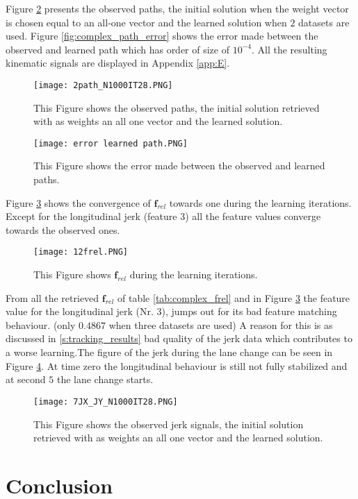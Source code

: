 Figure \ref{fig:complex_path} presents the observed paths, the initial solution when the weight vector is chosen equal to an all-one vector and the learned solution when $2$ datasets are used. Figure \ref{fig:complex_path_error} shows the error made between the observed and learned path which has order of size of $10^{-4}$. All the resulting kinematic signals are displayed in Appendix \ref{app:E}.

\begin{figure}[h!]
	\centering
	\texttt{[image: 2path\_N1000IT28.PNG]}
	\caption{This Figure shows the observed paths, the initial solution retrieved with as weights an all one vector and the learned solution.}	
	\label{fig:complex_path}
\end{figure}

\begin{figure}[h!]
	\centering
	\texttt{[image: error learned path.PNG]}
	\caption{This Figure shows the error made between the observed and learned paths.}	
	\label{fig:complex_path}
\end{figure}

Figure \ref{fig:complex_convergence} shows the convergence of $\bm{f}_{rel}$ towards one during the learning iterations. Except for the longitudinal jerk (feature $3$) all the feature values converge towards the observed ones.

\begin{figure}[h!]
	\centering
	\texttt{[image: 12frel.PNG]}
	\caption{This Figure shows $\bm{f}_{rel}$ during the learning iterations.}	
	\label{fig:complex_convergence}
\end{figure}
\newpage
From all the retrieved $\bm{f}_{rel}$ of table \ref{tab:complex_frel} and in Figure \ref{fig:complex_convergence} the feature value for the longitudinal jerk (Nr. $3$), jumps out for its bad feature matching behaviour. (only $0.4867$ when three datasets are used) A reason for this is as discussed in \ref{s:tracking_results} bad quality of the jerk data which contributes to a worse learning.The figure of the jerk during the lane change can be seen in Figure \ref{fig:complex_jerk}. At time zero the longitudinal behaviour is still not fully stabilized and at second $5$ the lane change starts.

\begin{figure}[h!]
	\centering
	\texttt{[image: 7JX\_JY\_N1000IT28.PNG]}
	\caption{This Figure shows the observed jerk signals, the initial solution retrieved with as weights an all one vector and the learned solution.}	
	\label{fig:complex_jerk}
\end{figure}
                                    
                    











\section{Conclusion}

